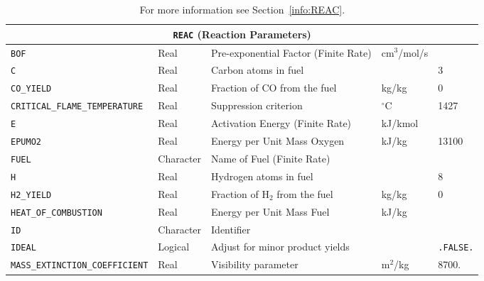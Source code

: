 \documentclass[11pt]{book}
\newcommand{\ct}{\tt\small}
\begin{document}
\begin{table}[H]
\caption{For more information see Section~\ref{info:REAC}.}\label{tbl:REAC}
\noindent
\begin{tabular*}{\textwidth}{@{\extracolsep{\fill}}|l|l|l|l|l|}
\hline
\multicolumn{5}{|c|}{{\ct REAC} (Reaction Parameters)} \\ \hline \hline
{\ct BOF}                                 & Real        & Pre-exponential Factor (Finite Rate)      &   cm$^3$/mol/s    &     \\ \hline
{\ct C}                                   & Real        & Carbon atoms in fuel                      &                   & 3    \\ \hline
{\ct CO\_YIELD}                           & Real        & Fraction of CO from the fuel              & kg/kg             & 0        \\ \hline
{\ct CRITICAL\_FLAME\_TEMPERATURE}        & Real        & Suppression criterion                     &   $^\circ$C       & 1427    \\ \hline
{\ct E}                                   & Real        & Activation Energy (Finite Rate)           &   kJ/kmol         &     \\ \hline
{\ct EPUMO2}                              & Real        & Energy per Unit Mass Oxygen               &   kJ/kg           & 13100    \\ \hline
{\ct FUEL}                                & Character   & Name of Fuel (Finite Rate)                &                   &     \\ \hline
{\ct H}                                   & Real        & Hydrogen atoms in fuel                    &                   & 8    \\ \hline
{\ct H2\_YIELD}                           & Real        & Fraction of H$_2$ from the fuel           & kg/kg             & 0        \\ \hline
{\ct HEAT\_OF\_COMBUSTION}                & Real        & Energy per Unit Mass Fuel                 &   kJ/kg           &         \\ \hline
{\ct ID}                                  & Character   & Identifier                                &                   &     \\ \hline
{\ct IDEAL}                               & Logical     & Adjust for minor product yields           &                   & {\ct .FALSE.}    \\ \hline
{\ct MASS\_EXTINCTION\_COEFFICIENT}       & Real        & Visibility parameter                      &  m$^2$/kg         & 8700.    \\ \hline

\end{tabular*}
\end{table}
\end{document}
